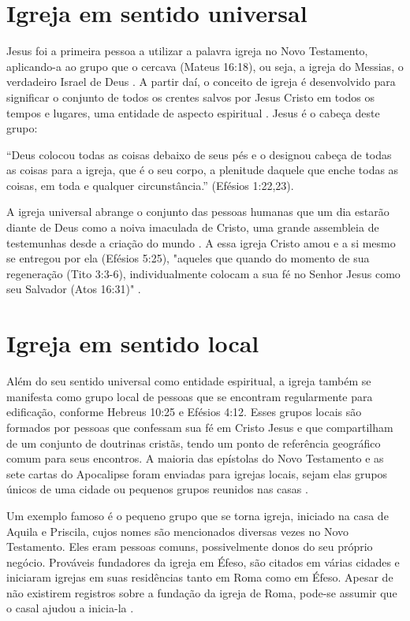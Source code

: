 \documentclass[12pt,openright,oneside,a4paper,
english,french,spanish,brazil]{abntex2}
\begin{document}
\section{Igreja em sentido universal}

Jesus foi a primeira pessoa a utilizar a palavra igreja no Novo Testamento, aplicando-a ao grupo que o cercava (Mateus 16:18), ou seja, a igreja do Messias, o verdadeiro Israel de Deus \cite[p. 911]{berkhof}. A partir daí, o conceito de igreja é desenvolvido para significar o conjunto de todos os crentes salvos por Jesus Cristo em todos os tempos e lugares, uma entidade de aspecto espiritual \cite[p. 318]{zac}. Jesus é o cabeça deste grupo:

\begin{citacao}“Deus colocou todas as coisas debaixo de seus pés e o designou cabeça de todas as coisas para a igreja, que é o seu corpo, a plenitude daquele que enche todas as coisas, em toda e qualquer circunstância.” (Efésios 1:22,23).
\end{citacao}

A igreja universal abrange o conjunto das pessoas humanas que um dia estarão diante de Deus como a noiva imaculada de Cristo, uma grande assembleia de testemunhas desde a criação do mundo \cite[p. 607]{bavinck}. A essa igreja Cristo amou e a si mesmo se entregou por ela (Efésios 5:25), "aqueles que quando do momento de sua regeneração (Tito 3:3-6), individualmente colocam a sua fé no Senhor Jesus como seu Salvador (Atos 16:31)" \cite[p. 319]{zac}.

\section{Igreja em sentido local}

Além do seu sentido universal como entidade espiritual, a igreja também se manifesta como grupo local de pessoas que se encontram regularmente para edificação, conforme Hebreus 10:25 e Efésios 4:12. Esses grupos locais são formados por pessoas que confessam sua fé em Cristo Jesus e que compartilham de um conjunto de doutrinas cristãs, tendo um ponto de referência geográfico comum para seus encontros. A maioria das epístolas do Novo Testamento e as sete cartas do Apocalipse foram enviadas para igrejas locais, sejam elas grupos únicos de uma cidade ou pequenos grupos reunidos nas casas \cite[p. 320]{zac}. 

Um exemplo famoso é o pequeno grupo que se torna igreja, iniciado na casa de Aquila e Priscila, cujos nomes são mencionados diversas vezes no Novo Testamento. Eles eram pessoas comuns, possivelmente donos do seu próprio negócio. Prováveis fundadores da igreja em Éfeso, são citados em várias cidades e iniciaram igrejas em suas residências tanto em Roma como em Éfeso. Apesar de não existirem registros sobre a fundação da igreja de Roma, pode-se assumir que o casal ajudou a inicia-la \cite[p. 54]{stetzer}.
\end{document}

